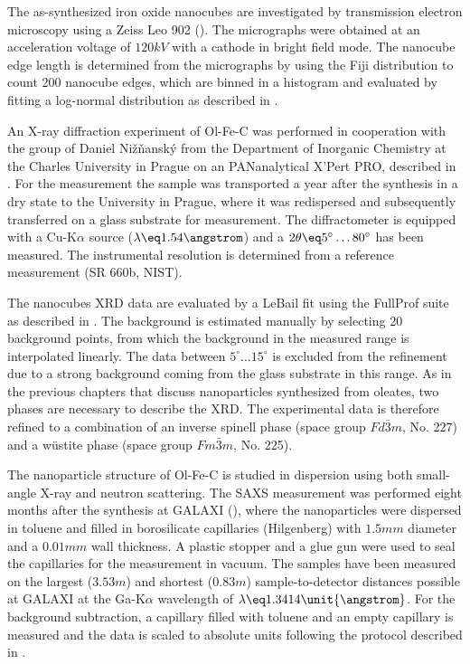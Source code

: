 \documentclass[\main/dresen_thesis.tex]{subfiles}
\begin{document}
    The as-synthesized iron oxide nanocubes are investigated by transmission electron microscopy using a Zeiss Leo 902 ().
    The micrographs were obtained at an acceleration voltage of $120 \unit{kV}$ with a  cathode in bright field mode.
    The nanocube edge length is determined from the micrographs by using the Fiji distribution \cite{Schindelin_2012_Fijia} to count 200 nanocube edges, which are binned in a histogram and evaluated by fitting a log-normal distribution as described in .

    An X-ray diffraction experiment of Ol-Fe-C was performed in cooperation with the group of Daniel Nižňanský from the Department of Inorganic Chemistry at the Charles University in Prague on an PANanalytical X'Pert PRO, described in .
    For the measurement the sample was transported a year after the synthesis in a dry state to the University in Prague, where it was redispersed and subsequently transferred on a glass substrate for measurement.
    The diffractometer is equipped with a Cu-K$\alpha$ source ($\lambda \eq 1.54 \angstrom$) and a $2 \theta \eq 5^\circ \ldots 80^\circ$ has been measured.
    The instrumental resolution is determined from a  reference measurement (SR 660b, NIST).

    The nanocubes XRD data are evaluated by a LeBail fit using the FullProf suite \cite{Rodriguez_1993_Recen} as described in .
    The background is estimated manually by selecting 20 background points, from which the background in the measured range is interpolated linearly.
    The data between $5 ^\circ \ldots 15 ^\circ$ is excluded from the refinement due to a strong background coming from the glass substrate in this range.
    As in the previous chapters that discuss nanoparticles synthesized from oleates, two phases are necessary to describe the XRD.
    The experimental data is therefore refined to a combination of an inverse spinell phase (space group $Fd\bar{3}m$, No. 227) and a w\"ustite phase (space group $Fm\bar{3}m$, No. 225).

    The nanoparticle structure of Ol-Fe-C is studied in dispersion using both small-angle X-ray and neutron scattering.
    The SAXS measurement was performed eight months after the synthesis at GALAXI (), where the nanoparticles were dispersed in toluene and filled in borosilicate capillaries (Hilgenberg) with $1.5 \unit{mm}$ diameter and a $0.01 \unit{mm}$ wall thickness.
    A plastic stopper and a glue gun were used to seal the capillaries for the measurement in vacuum.
    The samples have been measured on the largest ($3.53 \unit{m}$) and shortest ($0.83 \unit{m}$) sample-to-detector distances possible at GALAXI at the Ga-K$\alpha$ wavelength of $\lambda \eq 1.3414 \unit{\angstrom}$.
    For the background subtraction, a capillary filled with toluene and an empty capillary is measured and the data is scaled to absolute units following the protocol described in .
\end{document}
